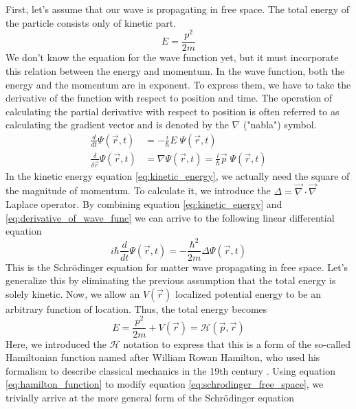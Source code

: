First, let's assume that our wave is propagating in free space.
The total energy of the particle consists only of kinetic part.
\begin{equation}
	\label{eq:kinetic_energy}
	E=\frac{p^2}{2m}
\end{equation}
We don't know the equation for the wave function yet, but it must incorporate this relation between the energy and momentum.
In the wave function, both the energy and the momentum are in exponent.
To express them, we have to take the derivative of the function with respect to position and time.
The operation of calculating the partial derivative with respect to position is often referred to as calculating the gradient vector and is denoted by the $\nabla$ ("nabla") symbol.
\begin{equation}
	\label{eq:derivative_of_wave_func}
	\begin{split}
		\frac{d}{dt}\Psi(\vec{r}, t) &= -\frac{i}{\hbar}E\;\Psi(\vec{r}, t)\\
		\frac{\delta}{\delta\vec{r}}\Psi(\vec{r}, t) &= \nabla \Psi(\vec{r}, t) =	\frac{i}{\hbar}\vec{p}\;\Psi(\vec{r}, t)
	\end{split}
\end{equation}
In the kinetic energy equation \ref{eq:kinetic_energy}, we actually need the square of the magnitude of momentum.
To calculate it, we introduce the $\Delta = \vec{\nabla} \cdot \vec{\nabla}$ Laplace operator.
By combining equation \ref{eq:kinetic_energy} and \ref{eq:derivative_of_wave_func} we can arrive to the following linear differential equation
\begin{equation}
	\label{eq:schrodinger_free_space}
	i \hbar \frac{d}{dt}\Psi(\vec{r}, t) = - \frac{\hbar^2}{2m}\Delta\Psi(\vec{r}, t)
\end{equation}
This is the Schrödinger equation for matter wave propagating in free space.
Let's generalize this by eliminating the previous assumption that the total energy is solely kinetic.
Now, we allow an $V(\vec{r})$ localized potential energy to be an arbitrary function of location. Thus, the total energy becomes
\begin{equation}
	\label{eq:hamilton_function}
	E = \frac{p^2}{2m} + V(\vec{r}) = \mathcal{H}(\vec{p}, \vec{r})
\end{equation}
Here, we introduced the $\mathcal{H}$ notation to express that this is a form of the so-called Hamiltonian function named after William Rowan Hamilton, who used his formalism to describe classical mechanics in the 19th century \cite{Hamilton1833}.
Using equation \ref{eq:hamilton_function} to modify equation \ref{eq:schrodinger_free_space}, we trivially arrive at the more general form of the Schrödinger equation

